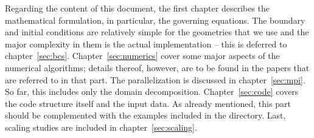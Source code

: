 Regarding the content of this document, the first chapter describes the
mathematical formulation, in particular, the governing equations. The boundary
and initial conditions are relatively simple for the geometries that we use and
the major complexity in them is the actual implementation -- this is deferred to
chapter~\ref{sec:bcs}. Chapter~\ref{sec:numerics} cover some major aspects of
the numerical algorithms; details thereof, however, are to be found in the
papers that are referred to in that part. The parallelization is discussed in
chapter~\ref{sec:mpi}. So far, this includes only the domain
decomposition. Chapter~\ref{sec:code} covers the code structure itself and the
input data. As already mentioned, this part should be complemented with the
examples included in the directory. Last, scaling studies are included in
chapter~\ref{sec:scaling}.
